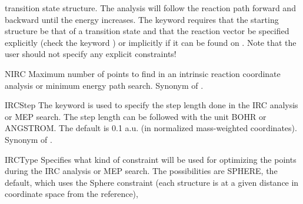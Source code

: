 \begin{keywordlist}
transition state structure. The analysis will follow the reaction path forward and
backward until the energy increases. The keyword requires that the starting structure be
that of a transition state and that the reaction vector be specified explicitly
(check the keyword ) or implicitly if it can be found on .
Note that the user should not specify any explicit constraints!
\item[NIRC]
Maximum number of points to find in an intrinsic reaction coordinate analysis or minimum energy path search.
Synonym of .
\item[IRCStep]
The keyword is used to specify the step length done in the IRC analysis or MEP search.
The step length can be followed with the unit BOHR or ANGSTROM. The default is 0.1 a.u.
(in normalized mass-weighted coordinates).
Synonym of .
\item[IRCType]
Specifies what kind of constraint will be used for optimizing the points during the IRC analysis or MEP search.
The possibilities are SPHERE, the default, which uses the Sphere constraint (each structure is at a given distance in coordinate space from the reference),

\end{keywordlist}
